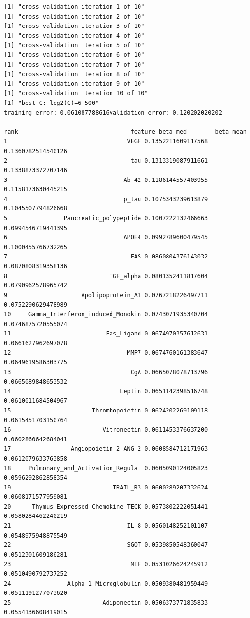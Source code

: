 \documentclass[
  letterpaper,
  DIV=11,
  numbers=noendperiod]{scrartcl}
\begin{document}
\begin{verbatim}
[1] "cross-validation iteration 1 of 10"
[1] "cross-validation iteration 2 of 10"
[1] "cross-validation iteration 3 of 10"
[1] "cross-validation iteration 4 of 10"
[1] "cross-validation iteration 5 of 10"
[1] "cross-validation iteration 6 of 10"
[1] "cross-validation iteration 7 of 10"
[1] "cross-validation iteration 8 of 10"
[1] "cross-validation iteration 9 of 10"
[1] "cross-validation iteration 10 of 10"
[1] "best C: log2(C)=6.500"
training error: 0.061087788616validation error: 0.120202020202

rank                                feature beta_med        beta_mean
1                                  VEGF 0.1352211609117568  0.1360782514540126
2                                   tau 0.1313319087911661  0.1338873372707146
3                                 Ab_42 0.1186144557403955  0.1158173630445215
4                                 p_tau 0.1075343239613879  0.1045507794826668
5                Pancreatic_polypeptide 0.1007222132466663  0.0994546719441395
6                                 APOE4 0.0992789600479545  0.1000455766732265
7                                   FAS 0.0860804376143032  0.0870808319358136
8                             TGF_alpha 0.0801352411817604  0.0790962578965742
9                     Apolipoprotein_A1 0.0767218226497711  0.0752290629478989
10     Gamma_Interferon_induced_Monokin 0.0743071935340704  0.0746875720555074
11                           Fas_Ligand 0.0674970357612631  0.0661627962697078
12                                 MMP7 0.0674760161383647  0.0649619586303775
13                                  CgA 0.0665078078713796  0.0665089848653532
14                               Leptin 0.0651142398516748  0.0610011684504967
15                       Thrombopoietin 0.0624202269109118  0.0615451703150764
16                          Vitronectin 0.0611453376637200  0.0602860642684041
17                 Angiopoietin_2_ANG_2 0.0608584712171963  0.0612079633763858
18     Pulmonary_and_Activation_Regulat 0.0605090124005823  0.0596292862858354
19                             TRAIL_R3 0.0600289207332624  0.0608171577959081
20      Thymus_Expressed_Chemokine_TECK 0.0573802222051441  0.0580284462240219
21                                 IL_8 0.0560148252101107  0.0548975948875549
22                                 SGOT 0.0539850548360047  0.0512301609186281
23                                  MIF 0.0531026624245912  0.0510490792737252
24                Alpha_1_Microglobulin 0.0509380481959449  0.0511191277073620
25                          Adiponectin 0.0506373771835833  0.0554136608419015

\end{verbatim}
\end{document}
